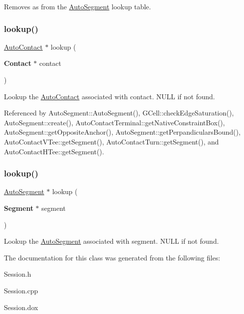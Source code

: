 Removes {\ttfamily as} from the \hyperlink{classKatabatic_1_1AutoSegment}{Auto\+Segment} lookup table. \mbox{\label{classKatabatic_1_1Session_acc20c1f675cc59f9a0068aba727eca47}} 
\subsubsection{\texorpdfstring{lookup()}{lookup()}\hspace{0.1cm}{\footnotesize\ttfamily [1/2]}}
{\footnotesize\ttfamily \hyperlink{classKatabatic_1_1AutoContact}{Auto\+Contact} $\ast$ lookup (\begin{DoxyParamCaption}\item[{\textbf{ Contact} $\ast$}]{contact }\end{DoxyParamCaption})\hspace{0.3cm}{\ttfamily [static]}}

Lookup the \hyperlink{classKatabatic_1_1AutoContact}{Auto\+Contact} associated with {\ttfamily contact}. {\ttfamily N\+U\+LL} if not found. 

Referenced by Auto\+Segment\+::\+Auto\+Segment(), G\+Cell\+::check\+Edge\+Saturation(), Auto\+Segment\+::create(), Auto\+Contact\+Terminal\+::get\+Native\+Constraint\+Box(), Auto\+Segment\+::get\+Opposite\+Anchor(), Auto\+Segment\+::get\+Perpandiculars\+Bound(), Auto\+Contact\+V\+Tee\+::get\+Segment(), Auto\+Contact\+Turn\+::get\+Segment(), and Auto\+Contact\+H\+Tee\+::get\+Segment().

\mbox{\label{classKatabatic_1_1Session_a6e465f0a592fee7e1e45b6c825b8a5da}} 
\subsubsection{\texorpdfstring{lookup()}{lookup()}\hspace{0.1cm}{\footnotesize\ttfamily [2/2]}}
{\footnotesize\ttfamily \hyperlink{classKatabatic_1_1AutoSegment}{Auto\+Segment} $\ast$ lookup (\begin{DoxyParamCaption}\item[{\textbf{ Segment} $\ast$}]{segment }\end{DoxyParamCaption})\hspace{0.3cm}{\ttfamily [static]}}

Lookup the \hyperlink{classKatabatic_1_1AutoSegment}{Auto\+Segment} associated with {\ttfamily segment}. {\ttfamily N\+U\+LL} if not found. 

The documentation for this class was generated from the following files\+:\begin{DoxyCompactItemize}
\item 
Session.\+h\item 
Session.\+cpp\item 
Session.\+dox\end{DoxyCompactItemize}
